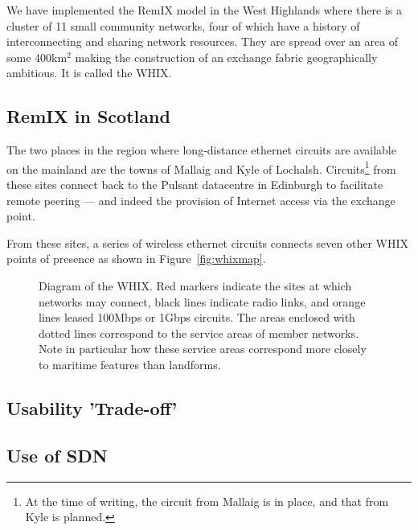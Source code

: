 
We have implemented the RemIX model in the West Highlands where there
is a cluster of
11 small community networks, four of which have a history of
interconnecting and sharing network resources. They are spread over an
area of some 400km$^2$  making the
construction of an exchange fabric geographically ambitious. It is
called the \acf{WHIX}.

\subsection{RemIX in Scotland}

The two places in the region where long-distance ethernet circuits are
available on the mainland are the towns of Mallaig and Kyle of
Lochalsh. Circuits\footnote{At the time of writing, the circuit from
Mallaig is in place, and that from Kyle is planned.} from these sites
connect back to the Pulsant datacentre in Edinburgh to facilitate
remote peering --- and indeed the provision of Internet access via the
exchange point.

From these sites, a series of wireless ethernet circuits connects
seven other \ac{WHIX} points of presence as shown in
Figure~\ref{fig:whixmap}.
\begin{figure}[h]
  \resizebox{\linewidth}{!}{
    \begin{tikzpicture}
      \whixphysicaldiagram
    \end{tikzpicture}
  }
  \caption{
  Diagram of the \acf{WHIX}. Red markers indicate
  the sites at which networks may connect, black lines indicate radio
  links, and orange lines leased 100Mbps or 1Gbps circuits. The areas
  enclosed with dotted lines correspond to the service areas of member
  networks. Note in particular how these service areas correspond more 
  closely to maritime features than landforms.
  }
  \label{whixmap}
\end{figure}



\subsection{Usability 'Trade-off'} \label{subsec:use}


\subsection{Use of SDN}


